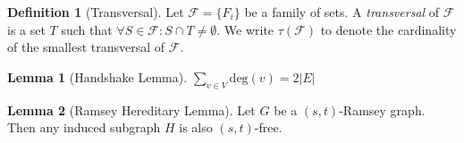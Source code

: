 \documentclass[a4paper]{article}
\newcommand{\abs}[1]{\left|#1\right|}
\newcommand{\F}{\mathcal{F}}
\theoremstyle{definition}
\newtheorem{definition}{Definition}
\newtheorem{lemma}{Lemma}
\begin{document}
\begin{definition}[Transversal]
	Let $\F = \{ F_i \}$ be a family of sets.
	A \emph{transversal} of $\F$ is a set $T$ such that $\forall S \in \F \colon S \cap T \neq \emptyset$.
	We write $\tau(\F)$ to denote the cardinality of the smallest transversal of $\F$.
\end{definition}

\begin{lemma}[Handshake Lemma]
	$\sum_{v \in V} \text{deg}(v) = 2 \abs{E}$
\end{lemma}

\begin{lemma}[Ramsey Hereditary Lemma]
	Let $G$ be a $(s, t)$-Ramsey graph. Then any induced subgraph $H$ is also $(s, t)$-free.
\end{lemma}

\nocite{angeltveit_mckay_2026}
\nocite{mckay_radziszowski_1992}
\nocite{biere_et_al_2024}
\nocite{elffers_nordstrom_2018}
\nocite{bolusani_et_al_2024}
\nocite{mckay_piperno_2014}
\nocite{de_moura_ullrich_2021}



\end{document}
